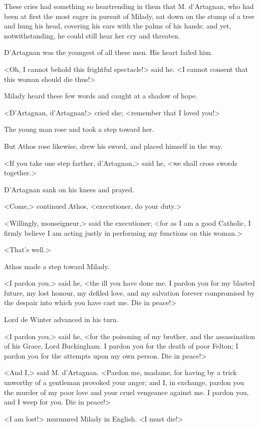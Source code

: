 These cries had something so heartrending in them that M. d'Artagnan, who had been at first the most eager in pursuit of Milady, sat down on the stump of a tree and hung his head, covering his ears with the palms of his hands; and yet, notwithstanding, he could still hear her cry and threaten. 

D'Artagnan was the youngest of all these men. His heart failed him. 

<Oh, I cannot behold this frightful spectacle!> said he. <I cannot consent that this woman should die thus!> 

Milady heard these few words and caught at a shadow of hope. 

<D'Artagnan, d'Artagnan!> cried she; <remember that I loved you!> 

The young man rose and took a step toward her. 

But Athos rose likewise, drew his sword, and placed himself in the way. 

<If you take one step farther, d'Artagnan,> said he, <we shall cross swords together.> 

D'Artagnan sank on his knees and prayed. 

<Come,> continued Athos, <executioner, do your duty.> 

<Willingly, monseigneur,> said the executioner; <for as I am a good Catholic, I firmly believe I am acting justly in performing my functions on this woman.> 

<That's well.> 

Athos made a step toward Milady. 

<I pardon you,> said he, <the ill you have done me. I pardon you for my blasted future, my lost honour, my defiled love, and my salvation forever compromised by the despair into which you have cast me. Die in peace!> 

Lord de Winter advanced in his turn. 

<I pardon you,> said he, <for the poisoning of my brother, and the assassination of his Grace, Lord Buckingham. I pardon you for the death of poor Felton; I pardon you for the attempts upon my own person. Die in peace!> 

<And I,> said M. d'Artagnan. <Pardon me, madame, for having by a trick unworthy of a gentleman provoked your anger; and I, in exchange, pardon you the murder of my poor love and your cruel vengeance against me. I pardon you, and I weep for you. Die in peace!> 

<I am lost!> murmured Milady in English. <I must die!> 

